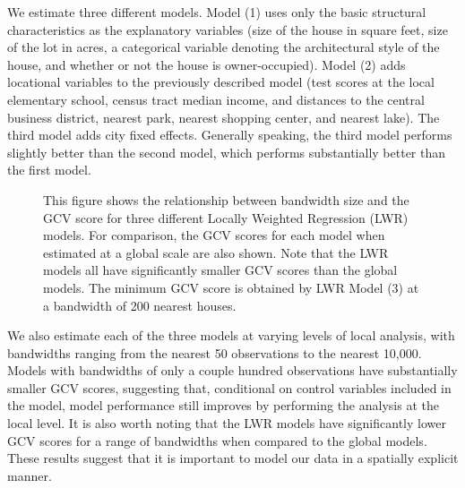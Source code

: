 \documentclass{article}\usepackage[]{graphicx}\usepackage[]{color}
\begin{document}
We estimate three different models. Model (1) uses only the basic structural characteristics as the explanatory variables (size of the house in square feet, size of the lot in acres, a categorical variable denoting the architectural style of the house, and whether or not the house is owner-occupied). Model (2) adds locational variables to the previously described model (test scores at the local elementary school, census tract median income, and distances to the central business district, nearest park, nearest shopping center, and nearest lake). The third model adds city fixed effects. Generally speaking, the third model performs slightly better than the second model, which performs substantially better than the first model. 
\begin{figure}
\caption{This figure shows the relationship between bandwidth size and the GCV score for three different Locally Weighted Regression (LWR) models. For comparison, the GCV scores for each model when estimated at a global scale are also shown. Note that the LWR models all have significantly smaller GCV scores than the global models. The minimum GCV score is obtained by LWR Model (3) at a bandwidth of 200 nearest houses.}\label{fig:GCVmodel}
\end{figure}

We also estimate each of the three models at varying levels of local analysis, with bandwidths ranging from the nearest 50 observations to the nearest 10,000. Models with bandwidths of only a couple hundred observations have substantially smaller GCV scores, suggesting that, conditional on control variables included in the model, model performance still improves by performing the analysis at the local level. It is also worth noting that the LWR models have significantly lower GCV scores for a range of bandwidths when compared to the global models. These results suggest that it is important to model our data in a spatially explicit manner. 
\end{document}
